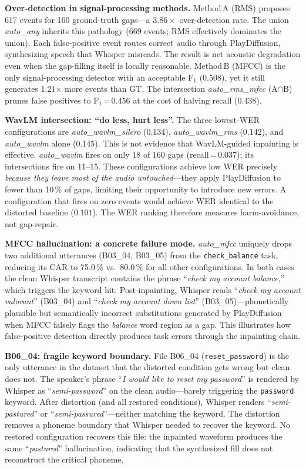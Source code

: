 \documentclass[9pt,twocolumn]{article}
\begin{document}
\noindent\textbf{Over-detection in signal-processing methods.}
Method\,A (RMS) proposes 617 events for 160 ground-truth gaps---a
$3.86\times$ over-detection rate.
The union \textit{auto\_any} inherits this pathology (669 events; RMS
effectively dominates the union).
Each false-positive event routes correct audio through PlayDiffusion,
synthesizing speech that Whisper misreads.
The result is net acoustic degradation even when the gap-filling itself
is locally reasonable.
Method\,B (MFCC) is the only signal-processing detector with an
acceptable F$_1$ (0.508), yet it still generates 1.21$\times$ more
events than GT.
The intersection \textit{auto\_rms\_mfcc} (A$\cap$B) prunes false
positives to F$_1$\,=\,0.456 at the cost of halving recall (0.438).

\noindent\textbf{WavLM intersection: ``do less, hurt less''.}
The three lowest-WER configurations are
\textit{auto\_wavlm\_silero} (0.134),
\textit{auto\_wavlm\_rms} (0.142), and
\textit{auto\_wavlm} alone (0.145).
This is not evidence that WavLM-guided inpainting is effective.
\textit{auto\_wavlm} fires on only 18 of 160 gaps (recall\,=\,0.037);
its intersections fire on 11--15.
These configurations achieve low WER precisely \emph{because they leave
most of the audio untouched}---they apply PlayDiffusion to fewer than
10\,\% of gaps, limiting their opportunity to introduce new errors.
A configuration that fires on zero events would achieve WER identical
to the distorted baseline ($0.101$).
The WER ranking therefore measures harm-avoidance, not gap-repair.

\noindent\textbf{MFCC hallucination: a concrete failure mode.}
\textit{auto\_mfcc} uniquely drops two additional utterances
(B03\_04, B03\_05) from the \texttt{check\_balance} task,
reducing its CAR to 75.0\,\% vs.\ 80.0\,\% for all other configurations.
In both cases the clean Whisper transcript contains the phrase
``\textit{check my account balance},'' which triggers the keyword hit.
Post-inpainting, Whisper reads
``\textit{check my account valorant}'' (B03\_04) and
``\textit{check my account down list}'' (B03\_05)---phonetically plausible
but semantically incorrect substitutions generated by PlayDiffusion
when MFCC falsely flags the \emph{balance} word region as a gap.
This illustrates how false-positive detection directly produces task
errors through the inpainting chain.

\noindent\textbf{B06\_04: fragile keyword boundary.}
File B06\_04 (\texttt{reset\_password}) is the only utterance in the
dataset that the distorted condition gets wrong but clean does not.
The speaker's phrase ``\textit{I would like to reset my password}''
is rendered by Whisper as ``\textit{semi-password}'' on the clean
audio---barely triggering the \texttt{password} keyword.
After distortion (and all restored conditions), Whisper renders
``\textit{semi-pastured}'' or ``\textit{semi-passured}''---neither
matching the keyword.
The distortion removes a phoneme boundary that Whisper needed to
recover the keyword.
No restored configuration recovers this file: the inpainted waveform
produces the same ``\textit{pastured}'' hallucination, indicating
that the synthesized fill does not reconstruct the critical phoneme.
\end{document}
